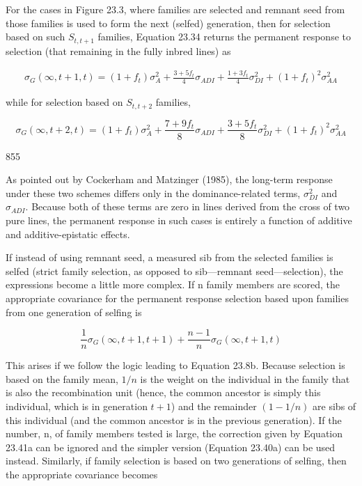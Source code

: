 \documentclass{article}
\begin{document}
For the cases in Figure 23.3, where families are selected and remnant seed from those families is used to form the next (selfed) generation, then for selection based on such  $ S_{t,t+1} $ families, Equation 23.34 returns the permanent response to selection (that remaining in the fully inbred lines) as

\begin{equation}
\begin{align*}\sigma_G(\infty,t+1,t)=(1+f_t)\sigma_A^2+\frac{3+5f_t}{4}\sigma_{ADI}+\frac{1+3f_t}{4}\sigma_{DI}^2+(1+f_t)^2\sigma_{AA}^2\end{align*}
\tag{23.40a}
\label{eq:23_40a}
\end{equation}

while for selection based on  $ S_{t,t+2} $ families,

\begin{equation}
\sigma_{G}(\infty,t+2,t)=(1+f_{t})\sigma_{A}^{2}+\frac{7+9f_{t}}{8}\sigma_{ADI}+\frac{3+5f_{t}}{8}\sigma_{DI}^{2}+(1+f_{t})^{2}\sigma_{AA}^{2}
\tag{23.40b}
\label{eq:23_40b}
\end{equation}

855

As pointed out by Cockerham and Matzinger (1985), the long-term response under these two schemes differs only in the dominance-related terms,  $ \sigma_{DI}^{2} $ and  $ \sigma_{ADI} $. Because both of these terms are zero in lines derived from the cross of two pure lines, the permanent response in such cases is entirely a function of additive and additive-epistatic effects.

If instead of using remnant seed, a measured sib from the selected families is selfed (strict family selection, as opposed to sib—remnant seed—selection), the expressions become a little more complex. If n family members are scored, the appropriate covariance for the permanent response selection based upon families from one generation of selfing is

\begin{equation}
\frac{1}{n}\sigma_{G}(\infty,t+1,t+1)+\frac{n-1}{n}\sigma_{G}(\infty,t+1,t)
\tag{23.41a}
\label{eq:23_41a}
\end{equation}

This arises if we follow the logic leading to Equation 23.8b. Because selection is based on the family mean,  $ 1/n $ is the weight on the individual in the family that is also the recombination unit (hence, the common ancestor is simply this individual, which is in generation  $ t + 1 $) and the remainder  $ (1 - 1/n) $ are sibs of this individual (and the common ancestor is in the previous generation). If the number, n, of family members tested is large, the correction given by Equation 23.41a can be ignored and the simpler version (Equation 23.40a) can be used instead. Similarly, if family selection is based on two generations of selfing, then the appropriate covariance becomes
\end{document}
